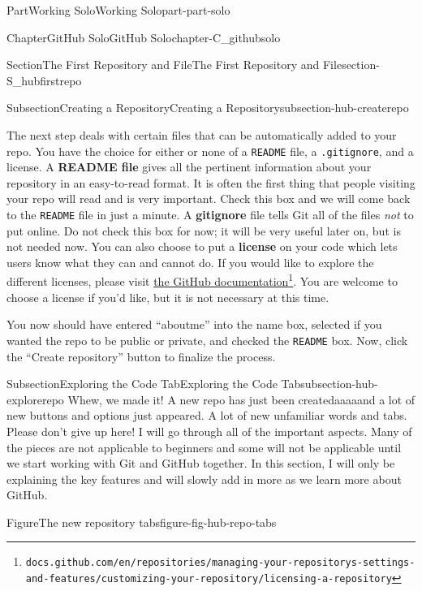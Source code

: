 \documentclass[twoside,10pt,]{book}
\newcommand{\mono}[1]{\texttt{#1}}
\newcommand{\terminology}[1]{\textbf{#1}}
\begin{document}
\begin{partptx}{Part}{Working Solo}{}{Working Solo}{}{}{part-part-solo}
\begin{chapterptx}{Chapter}{GitHub Solo}{}{GitHub Solo}{}{}{chapter-C_githubsolo}
\begin{sectionptx}{Section}{The First Repository and File}{}{The First Repository and File}{}{}{section-S_hubfirstrepo}
\begin{subsectionptx}{Subsection}{Creating a Repository}{}{Creating a Repository}{}{}{subsection-hub-createrepo}
\par
{} The next step deals with certain files that can be automatically added to your repo. You have the choice for either or none of a \mono{README} file, a \mono{.gitignore}, and a license. A \terminology{README file} gives all the pertinent information about your repository in an easy-to-read format. It is often the first thing that people visiting your repo will read and is very important. Check this box and we will come back to the \mono{README} file in just a minute. A \terminology{gitignore} file tells Git all of the files \emph{not} to put online. Do not check this box for now; it will be very useful later on, but is not needed now. You can also choose to put a \terminology{license} on your code which lets users know what they can and cannot do. If you would like to explore the different licenses, please visit \href{https://docs.github.com/en/repositories/managing-your-repositorys-settings-and-features/customizing-your-repository/licensing-a-repository}{the GitHub documentation}\footnote{\nolinkurl{docs.github.com/en/repositories/managing-your-repositorys-settings-and-features/customizing-your-repository/licensing-a-repository}\label{fn-hub-createrepo-k-l}}. You are welcome to choose a license if you'd like, but it is not necessary at this time.%
\par
You now should have entered ``aboutme'' into the name box, selected if you wanted the repo to be public or private, and checked the \mono{README} box. Now, click the ``Create repository'' button to finalize the process.%
\end{subsectionptx}
%
%
\typeout{************************************************}
\typeout{************************************************}
%
\begin{subsectionptx}{Subsection}{Exploring the Code Tab}{}{Exploring the Code Tab}{}{}{subsection-hub-explorerepo}
%
Whew, we made it! A new repo has just been created\textellipsis{}aaaaand a lot of new buttons and options just appeared. A lot of new unfamiliar words and tabs. Please don't give up here! I will go through all of the important aspects. Many of the pieces are not applicable to beginners and some will not be applicable until we start working with Git and GitHub together. In this section, I will only be explaining the key features and will slowly add in more as we learn more about GitHub.%
\begin{figureptx}{Figure}{The new repository tabs}{figure-fig-hub-repo-tabs}{}%

\end{figureptx}
\end{subsectionptx}
\end{sectionptx}
\end{chapterptx}
\end{partptx}
\end{document}
